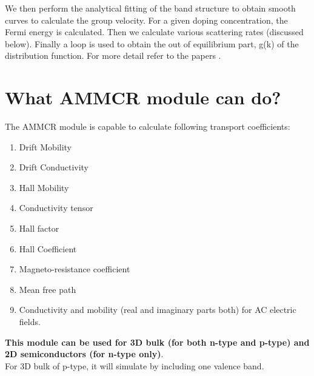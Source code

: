 \documentclass[12pt]{article}
\begin{document}
We then perform the analytical fitting of the band structure to obtain smooth curves to calculate the group velocity. For a given doping concentration, the Fermi energy is calculated. Then we calculate various scattering rates (discussed below). Finally a loop is used to obtain the out of equilibrium part, g(k) of the distribution function. For more detail refer to the papers \cite{anup1,anup2,anup3}.

\section{What AMMCR module can do?} \label{capability}
The AMMCR module is capable to calculate following transport coefficients:

\begin{enumerate}
    \item Drift Mobility
    \item Drift Conductivity
    \item Hall Mobility
    \item Conductivity tensor
    \item Hall factor
    \item Hall Coefficient
    \item Magneto-resistance coefficient
    \item Mean free path
    \item Conductivity and mobility (real and imaginary parts both) for AC electric fields.
\end{enumerate}


\textbf{This module can be used for 3D bulk (for both n-type and p-type) and 2D semiconductors (for n-type only)}.
\\
For 3D bulk of p-type, it will simulate by including one valence band. \\ \\
\end{document}
